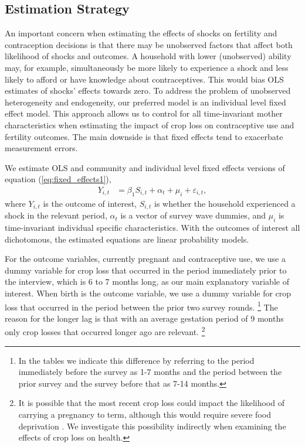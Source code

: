 \documentclass[letterpaper,12pt]{article}
\begin{document}
\subsection{Estimation Strategy}

An important concern when estimating
the effects of shocks on fertility and contraception decisions 
is that there may be unobserved factors that affect both likelihood of 
shocks and outcomes.
A household with lower (unobserved) ability may, for example, simultaneously be more 
likely to experience a shock and less likely to afford or have knowledge about 
contraceptives.
This would bias OLS estimates of shocks' effects towards zero.
To address the problem of unobserved heterogeneity and endogeneity, our
preferred model is an individual level fixed effect model. 
This approach allows us to control for all time-invariant mother characteristics when 
estimating the impact of crop loss on contraceptive use and fertility outcomes.
The main downside is that fixed effects tend to exacerbate measurement errors.

We estimate OLS and community and individual level fixed effects 
versions of equation (\ref{eq:fixed_effects1}),
\begin{align}
Y_{i,t} &=  \beta_1 S_{i,t}  + \alpha_{t} 
+ \mu_i + \varepsilon_{i,t},   \label{eq:fixed_effects1} 
\end{align}
where $Y_{i,t}$ is the outcome of interest,  
$S_{i,t}$ is whether the household experienced a shock in the relevant period,
$\alpha_{t}$ is a vector of survey wave dummies, 
and $\mu_i$ is time-invariant individual specific characteristics.
With the outcomes of interest all dichotomous, the estimated equations 
are linear probability models.
 
For the outcome variables, currently pregnant and contraceptive use, we use 
a dummy variable for crop loss that occurred in the period immediately 
prior to the interview, which is 6 to 7 months long, as our main explanatory 
variable of interest. 
When birth is the outcome variable, 
we use a dummy variable for crop loss that occurred in the period between 
the prior two survey rounds.%
\footnote{
In the tables we indicate this difference by referring to the period 
immediately before the survey as 1-7 months and the period between the
prior survey and the survey before that as 7-14 months.
}
The reason for the longer lag is that with an average gestation period
of 9 months only crop losses that occurred longer ago are relevant.%
\footnote{
It is possible that the most recent crop loss could impact the likelihood
of carrying a pregnancy to term, although this would require severe
food deprivation \citep{Hernandez-Julian2014}.
We investigate this possibility indirectly when examining the effects
of crop loss on health.
}
\end{document}
